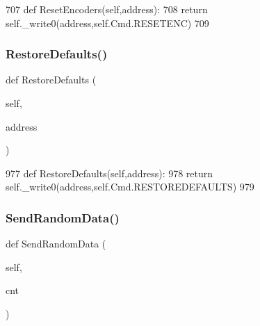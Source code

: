 \begin{DoxyCode}
707     \textcolor{keyword}{def }ResetEncoders(self,address):
708         \textcolor{keywordflow}{return} self.\_write0(address,self.Cmd.RESETENC)
709 
\end{DoxyCode}
\mbox{\label{classtoxic__hardware_1_1roboclaw__3_1_1Roboclaw_ae963de53e2a3be675dc00949c099140a}} 
\subsubsection{\texorpdfstring{Restore\+Defaults()}{RestoreDefaults()}}
{\footnotesize\ttfamily def Restore\+Defaults (\begin{DoxyParamCaption}\item[{}]{self,  }\item[{}]{address }\end{DoxyParamCaption})}


\begin{DoxyCode}
977     \textcolor{keyword}{def }RestoreDefaults(self,address):
978         \textcolor{keywordflow}{return} self.\_write0(address,self.Cmd.RESTOREDEFAULTS)
979 
\end{DoxyCode}
\mbox{\label{classtoxic__hardware_1_1roboclaw__3_1_1Roboclaw_ae99acedd53fe667ff7bed5d38a6859bd}} 
\subsubsection{\texorpdfstring{Send\+Random\+Data()}{SendRandomData()}}
{\footnotesize\ttfamily def Send\+Random\+Data (\begin{DoxyParamCaption}\item[{}]{self,  }\item[{}]{cnt }\end{DoxyParamCaption})}


